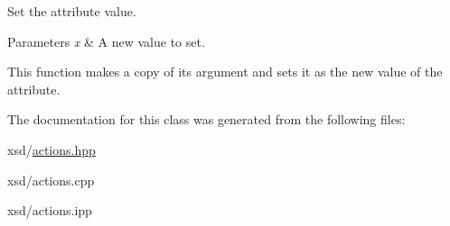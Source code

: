 Set the attribute value. 


\begin{DoxyParams}{Parameters}
{\em x} & A new value to set.\\
\hline
\end{DoxyParams}
This function makes a copy of its argument and sets it as the new value of the attribute. 

The documentation for this class was generated from the following files:\begin{DoxyCompactItemize}
\item 
xsd/\hyperlink{actions_8hpp}{actions.hpp}\item 
xsd/actions.cpp\item 
xsd/actions.ipp\end{DoxyCompactItemize}
